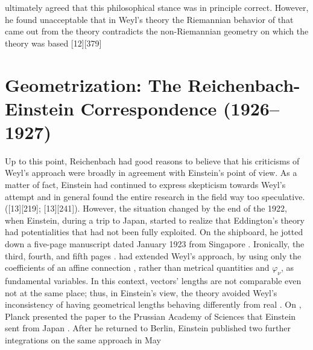 \documentclass[draft]{article}
\newcommand{\phin}{\ensuremath{\varphi_\nu}\xspace}
\begin{document}
ultimately agreed that this philosophical stance was in principle correct. However, he found unacceptable that in Weyl's theory the Riemannian behavior of \rac that came out from the theory contradicts the non-Riemannian geometry on which the theory was based [12][379]

\section{Geometrization: The Reichenbach-Einstein Correspondence (1926--1927)}
\label{geometrization}

Up to this point, Reichenbach had good reasons to believe that his criticisms of Weyl's approach were broadly in agreement with Einstein's point of view. As a matter of fact, Einstein had continued to express skepticism towards Weyl's attempt  and in general found the entire research in the field way too speculative. ([13][219]; [13][241]). However, the situation changed by the end of the 1922, when Einstein, during a trip to Japan, started to realize that Eddington's theory had potentialities that had not been fully exploited. On the shipboard, he jotted down a five-page manuscript dated January 1923 from Singapore . Ironically, the third, fourth, and fifth pages  \citep{Reichenbach1921}. \citet{Eddington1921} had extended Weyl's approach, by using only the coefficients of an affine connection \Gtmn, rather than metrical quantities \gmn and \phin, as fundamental variables. In this context, vectors' lengths are not comparable even not at the same place; thus, in Einstein's view, the theory avoided Weyl's inconsistency of having geometrical lengths behaving differently from real \rac.  On , Planck presented the paper  to the Prussian Academy of Sciences that Einstein sent from Japan \citep{Einstein1923c}. After he returned to Berlin, Einstein published two further integrations on the same approach in May \cite{Einstein1923c,Einstein1923e}
\end{document}
